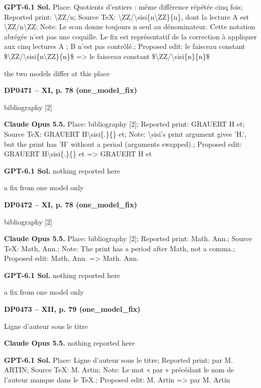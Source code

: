 \textbf{GPT-6.1 Sol.} Place: Quotients d'entiers : même différence répétée cinq fois; Reported print: \textbackslash{}ZZ/n; Source TeX: \textbackslash{}ZZ/\textbackslash{}sisi\{n\textbackslash{}ZZ\}\{n\}, dont la lecture A est \textbackslash{}ZZ/n\textbackslash{}ZZ; Note: Le scan donne toujours n seul au dénominateur. Cette notation abrégée n'est pas une coquille. Le fix est représentatif de la correction à appliquer aux cinq lectures A ; B n'est pas contrôlé.; Proposed edit: le faisceau constant \$\textbackslash{}ZZ/\textbackslash{}sisi\{n\textbackslash{}ZZ\}\{n\}\$ =\allowbreak > le faisceau constant \$\textbackslash{}ZZ/\textbackslash{}sisi\{n\}\{n\}\$\par
the two models differ at this place\par
\par\noindent\hypertarget{DP0471}{}\textbf{DP0471 -- XI, p. 78 (one\_model\_fix)}\par
bibliography [2]\par
\textbf{Claude Opus 5.5.} Place: bibliography [2]; Reported print: GRAUERT H et; Source TeX: GRAUERT H\textbackslash{}sisi\{.\}\{\} et; Note: \textbackslash{}sisi's print argument gives 'H.', but the print has 'H' without a period (arguments swapped).; Proposed edit: GRAUERT H\textbackslash{}sisi\{.\}\{\} et =\allowbreak > GRAUERT H et\par
\textbf{GPT-6.1 Sol.} nothing reported here\par
a fix from one model only\par
\par\noindent\hypertarget{DP0472}{}\textbf{DP0472 -- XI, p. 78 (one\_model\_fix)}\par
bibliography [2]\par
\textbf{Claude Opus 5.5.} Place: bibliography [2]; Reported print: Math. Ann.; Source TeX: Math, Ann.; Note: The print has a period after Math, not a comma.; Proposed edit: Math, Ann. =\allowbreak > Math. Ann.\par
\textbf{GPT-6.1 Sol.} nothing reported here\par
a fix from one model only\par
\par\noindent\hypertarget{DP0473}{}\textbf{DP0473 -- XII, p. 79 (one\_model\_fix)}\par
Ligne d’auteur sous le titre\par
\textbf{Claude Opus 5.5.} nothing reported here\par
\textbf{GPT-6.1 Sol.} Place: Ligne d’auteur sous le titre; Reported print: par M. ARTIN; Source TeX: M. Artin; Note: Le mot « par » précédant le nom de l’auteur manque dans le TeX.; Proposed edit: M. Artin =\allowbreak > par M. Artin\par
